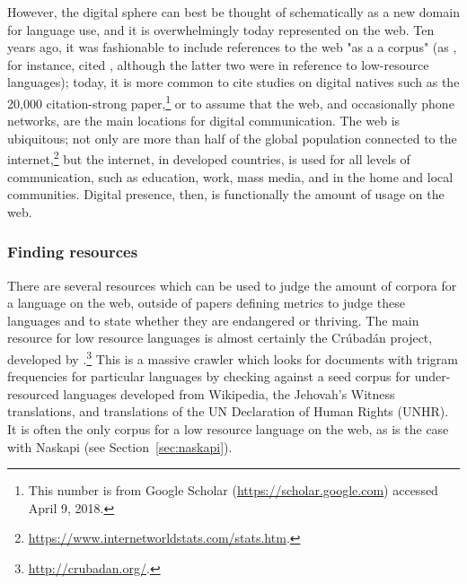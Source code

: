 However, the digital sphere can best be thought of schematically as a new domain for language use, and it is overwhelmingly today represented on the web. Ten years ago, it was fashionable to include references to the web "as a a corpus" (as \citet{scannell2007crubadan}, for instance, cited \citet{resnik1999mining, ghani2001mining, kilgarriff2001web}, although the latter two were in reference to low-resource languages); today, it is more common to cite studies on digital natives such as the 20,000 citation-strong \citet{prensky2001digital} paper,\footnote{This number is from Google Scholar (\href{https://scholar.google.com}{https://scholar.google.com}) accessed April 9, 2018.} or to assume that the web, and occasionally phone networks, are the main locations for digital communication. The web is ubiquitous; not only are more than half of the global population connected to the internet,\footnote{\href{https://www.internetworldstats.com/stats.htm}{https://www.internetworldstats.com/stats.htm}. } but the internet, in developed countries, is used for all levels of communication, such as education, work, mass media, and in the home and local communities. Digital presence, then, is functionally the amount of usage on the web.

\subsubsection{Finding resources}
\label{subsec:finding-resources}

There are several resources which can be used to judge the amount of corpora for a language on the web, outside of papers defining metrics to judge these languages and to state whether they are endangered or thriving. The main resource for low resource languages is almost certainly the Cr\'ubad\'an project, developed by \citet{scannell2007crubadan}.\footnote{\href{http://crubadan.org/}{http://crubadan.org/}. } This is a massive crawler which looks for documents with trigram frequencies for particular languages by checking against a seed corpus for under-resourced languages developed from Wikipedia, the Jehovah's Witness translations, and translations of the UN Declaration of Human Rights (UNHR). It is often the only corpus for a low resource language on the web, as is the case with Naskapi (see Section~\ref{sec:naskapi}).


